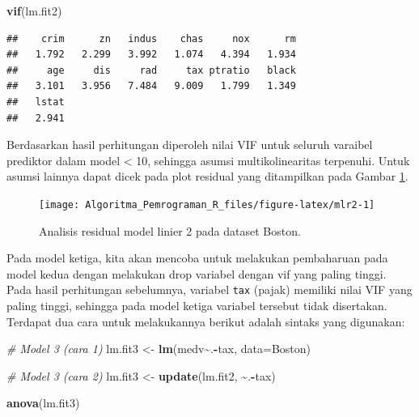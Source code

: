 \documentclass[
]{book}
\newenvironment{Shaded}{\begin{snugshade}}{\end{snugshade}}
\newcommand{\AttributeTok}[1]{\textcolor[rgb]{0.13,0.29,0.53}{#1}}
\newcommand{\CommentTok}[1]{\textcolor[rgb]{0.56,0.35,0.01}{\textit{#1}}}
\newcommand{\FunctionTok}[1]{\textcolor[rgb]{0.13,0.29,0.53}{\textbf{#1}}}
\newcommand{\NormalTok}[1]{#1}
\newcommand{\OtherTok}[1]{\textcolor[rgb]{0.56,0.35,0.01}{#1}}
\newcommand{\SpecialCharTok}[1]{\textcolor[rgb]{0.81,0.36,0.00}{\textbf{#1}}}
\theoremstyle{definition}
\theoremstyle{definition}
\theoremstyle{definition}
\theoremstyle{definition}
\theoremstyle{remark}
\begin{document}
\begin{Shaded}
\begin{Highlighting}[]
\FunctionTok{vif}\NormalTok{(lm.fit2)}
\end{Highlighting}
\end{Shaded}

\begin{verbatim}
##    crim      zn   indus    chas     nox      rm 
##   1.792   2.299   3.992   1.074   4.394   1.934 
##     age     dis     rad     tax ptratio   black 
##   3.101   3.956   7.484   9.009   1.799   1.349 
##   lstat 
##   2.941
\end{verbatim}

Berdasarkan hasil perhitungan diperoleh nilai VIF untuk seluruh varaibel prediktor dalam model \textless{} 10, sehingga asumsi multikolinearitas terpenuhi. Untuk asumsi lainnya dapat dicek pada plot residual yang ditampilkan pada Gambar \ref{fig:mlr2}.

\begin{figure}

{\centering \texttt{[image: Algoritma\_Pemrograman\_R\_files/figure-latex/mlr2-1]} 

}

\caption{Analisis residual model linier 2 pada dataset Boston.}\label{fig:mlr2}
\end{figure}

Pada model ketiga, kita akan mencoba untuk melakukan pembaharuan pada model kedua dengan melakukan drop variabel dengan vif yang paling tinggi. Pada hasil perhitungan sebelumnya, variabel \texttt{tax} (pajak) memiliki nilai VIF yang paling tinggi, sehingga pada model ketiga variabel tersebut tidak disertakan. Terdapat dua cara untuk melakukannya berikut adalah sintaks yang digunakan:

\begin{Shaded}
\begin{Highlighting}[]
\CommentTok{\# Model 3 (cara 1)}
\NormalTok{lm.fit3 }\OtherTok{\textless{}{-}} \FunctionTok{lm}\NormalTok{(medv}\SpecialCharTok{\textasciitilde{}}\NormalTok{.}\SpecialCharTok{{-}}\NormalTok{tax, }\AttributeTok{data=}\NormalTok{Boston)}

\CommentTok{\# Model 3 (cara 2)}
\NormalTok{lm.fit3 }\OtherTok{\textless{}{-}} \FunctionTok{update}\NormalTok{(lm.fit2, }\SpecialCharTok{\textasciitilde{}}\NormalTok{.}\SpecialCharTok{{-}}\NormalTok{tax)}

\FunctionTok{anova}\NormalTok{(lm.fit3)}
\end{Highlighting}
\end{Shaded}
\end{document}
